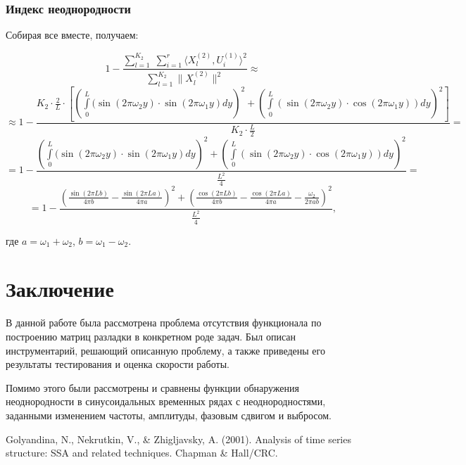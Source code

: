 \documentclass[specialist, substylefile = spbu.rtx,
			   subf, href, 12pt]{disser}
\begin{document}
\subsection{Индекс неоднородности}
Собирая все вместе, получаем:

$$ 1 - \frac{\sum\limits_{l=1}^{K_2}\;\sum\limits_{i=1}^{r}\langle X_l^{(2)}, U_i^{(1)}\rangle^2}{\sum\limits_{l=1}^{K_2}\|X_l^{(2)}\|^2} \approx  $$
$$ \approx 1 - \frac{K_2 \cdot \frac{2}{L} \cdot\left[\left(\int\limits_{0}^{L}(\sin(2\pi\omega_2 y) \cdot \sin(2\pi\omega_1 y)dy\right )^2 + \left(\int\limits_{0}^{L}(\sin(2\pi\omega_2 y) \cdot \cos(2\pi\omega_1 y))dy\right )^2\right ]}{K_2\cdot\frac{L}{2}} = $$
$$ = 1 - \frac{\left(\int\limits_{0}^{L}(\sin(2\pi\omega_2 y) \cdot \sin(2\pi\omega_1 y)dy\right )^2 + \left(\int\limits_{0}^{L}(\sin(2\pi\omega_2 y) \cdot \cos(2\pi\omega_1 y))dy\right )^2}{\frac{L^2}{4}} = $$
$$ =  1 - \frac{\left ( \frac{\sin(2\pi Lb)}{4\pi b} - \frac{\sin(2\pi La)}{4\pi a} \right )^2 + \left ( \frac{\cos(2\pi Lb)}{4\pi b} - \frac{\cos(2\pi La)}{4\pi a} - \frac{\omega_2}{2\pi ab}\right )^2}{\frac{L^2}{4}},$$

где $a = \omega_1 + \omega_2$, $b = \omega_1 - \omega_2$.






\newpage
\chapter*{Заключение}

В данной работе была рассмотрена проблема отсутствия функционала по построению матриц разладки в конкретном роде задач. Был описан инструментарий, решающий описанную проблему, а также приведены его результаты тестирования и оценка скорости работы. 

Помимо этого были рассмотрены и сравнены функции обнаружения неоднородности в синусоидальных временных рядах с неоднородностями, заданными изменением частоты, амплитуды, фазовым сдвигом и выбросом.




\begin{thebibliography}{3}
	Golyandina, N., Nekrutkin, V., \& Zhigljavsky, A. (2001). Analysis of time series structure: SSA and related techniques. Chapman \& Hall/CRC.
\end{thebibliography}

	
\end{document}
